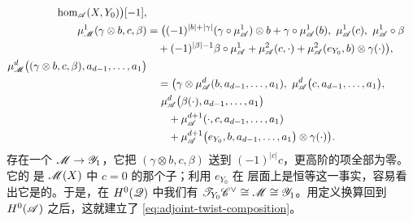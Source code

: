 \begin{remark}
\begin{equation*}
\begin{aligned}
\hom_{\mathscr{A}}(X,Y_0)\bigr)[-1],\\
\mu^1_{\mathscr{M}}(\gamma\otimes b,c,\beta)&=\bigl((-1)^{|b|+|\gamma|}
(\gamma\circ\mu^1_{\mathscr{A}})\otimes b+\gamma\circ\mu^1_{\mathscr{A}}(b),\
\mu^1_{\mathscr{A}}(c),\ \mu^1_{\mathscr{A}}\circ\beta\\
&\quad+(-1)^{|\beta|-1}\beta\circ\mu^1_{\mathscr{A}}+\mu^2_{\mathscr{A}}(c,\cdot)
+\mu^2_{\mathscr{A}}(e_{Y_0},b)\otimes\gamma(\cdot)\bigr),\\
\mu^d_{\mathscr{M}}\bigl((\gamma\otimes b,c,\beta),a_{d-1},\ldots,a_1\bigr)&\\
&\quad=\bigl(\gamma\otimes\mu^d_{\mathscr{A}}(b,a_{d-1},\ldots,a_1),\
\mu^d_{\mathscr{A}}\bigl(c,a_{d-1},\ldots,a_1\bigr),\\
&\quad\ \mu^d_{\mathscr{A}}\bigl(\beta(\cdot),a_{d-1},\ldots,a_1\bigr)\\
&\qquad+\mu^{d+1}_{\mathscr{A}}(\cdot,c,a_{d-1},\ldots,a_1)\\
&\qquad+\mu^{d+1}_{\mathscr{A}}\bigl(e_{Y_0},b,a_{d-1},\ldots,a_1\bigr)
\otimes\gamma(\cdot)\bigr).
\end{aligned}
\end{equation*}
存在一个\trModule{}\trHomomorphism{} $\mathscr{M}\to\mathscr{Y}_1$，它把
$(\gamma\otimes b,c,\beta)$ 送到 $(-1)^{|c|}c$，更高阶的项全部为零。它的%
\trKernel{}是 $\mathscr{M}(X)$ 中 $c=0$ 的那个子\trComplex；利用 $e_{Y_0}$ 在%
\trCohomology{}层面上是恒等这一事实，容易看出它是\trAcyclic{}的。于是，在
$H^0(\mathscr{Q})$ 中我们有\trIsomorphism{} $\mathscr{T}_{Y_0}\mathscr{C}^\vee\cong\mathscr{M}
\cong\mathscr{Y}_1$。用定义换算回到 $H^0(\mathscr{A})$ 之后，这就建立了
\eqref{eq:adjoint-twist-composition}。
\end{remark}
